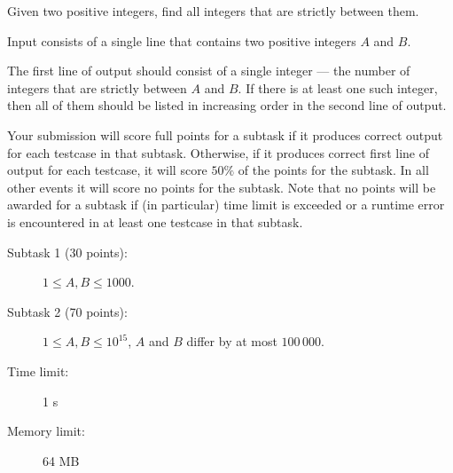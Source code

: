 \documentclass{boi2014}
\begin{document}
    Given two positive integers, find all integers that are strictly
    between them.

    \Input
    Input consists of a single line that contains two positive
    integers $A$ and $B$.

    \Output
    The first line of output should consist of a single integer ---
    the number of integers that are strictly between $A$ and $B$.
    If there is at least one such integer, then all of them should
    be listed in increasing order in the second line of output.
    
    \Examples

    \simpleexample
    {}
    {}

    \simpleexample
    {}
    {}

    \Scoring

        Your submission will score full points for a subtask if it
        produces correct output for each testcase in 
        that subtask. Otherwise, if it produces correct first
        line of output for each testcase, it will score $50\%$ of the
        points for the subtask. In all other events it will score no
        points for the subtask.
        Note that no points will be awarded for a subtask if
        (in particular) time
        limit is exceeded or a runtime error is encountered in at
        least one testcase in that subtask.

    \begin{description}

        \item[Subtask 1 (30 points):] $1 \le A, B \le 1000$. 
        \item[Subtask 2 (70 points):] $1 \le A, B \le 10^{15}$,
            $A$ and $B$ differ by at most $100\,000$.
    \end{description}

    \Constraints

    \begin{description}
        \item[Time limit:] 1 s
        \item[Memory limit:] 64 MB
    \end{description}
\end{document}
